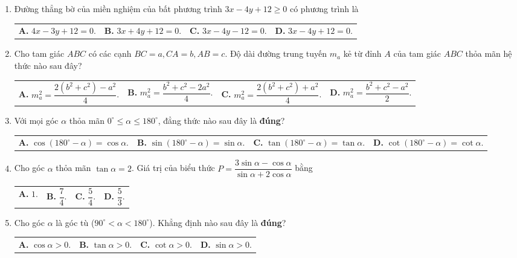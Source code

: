 \documentclass[12pt,a4paper]{article}
\makeatletter
\newcommand{\four}[4]{\par\noindent\begin{tabularx}{\linewidth}{@{}*{4}{>{\raggedright\arraybackslash}X}@{}}\textbf{A.} #1&\textbf{B.} #2&\textbf{C.} #3&\textbf{D.} #4\end{tabularx}}
\makeatother
\begin{document}
\begin{enumerate}
\item Đường thẳng bờ của miền nghiệm của bất phương trình $3x - 4y + 12 \ge 0$ có phương trình là
\four{$4x - 3y + 12 = 0$.}{$3x + 4y + 12 = 0$.}{$3x - 4y - 12 = 0$.}{$3x - 4y + 12 = 0$.}

\item Cho tam giác $ABC$ có các cạnh $BC = a, CA = b, AB = c$. Độ dài đường trung tuyến $m_a$ kẻ từ đỉnh $A$ của tam giác $ABC$ thỏa mãn hệ thức nào sau đây?
\four{$m_a^2 = \dfrac{2(b^2 + c^2) - a^2}{4}$.}{$m_a^2 = \dfrac{b^2 + c^2 - 2a^2}{4}$.}{$m_a^2 = \dfrac{2(b^2 + c^2) + a^2}{4}$.}{$m_a^2 = \dfrac{b^2 + c^2 - a^2}{2}$.}

\item Với mọi góc $\alpha$ thỏa mãn $0^\circ \le \alpha \le 180^\circ$, đẳng thức nào sau đây là \textbf{đúng}?
\four{$\cos(180^\circ - \alpha) = \cos \alpha$.}{$\sin(180^\circ - \alpha) = \sin \alpha$.}{$\tan(180^\circ - \alpha) = \tan \alpha$.}{$\cot(180^\circ - \alpha) = \cot \alpha$.}

\item Cho góc $\alpha$ thỏa mãn $\tan \alpha = 2$. Giá trị của biểu thức $P = \dfrac{3\sin \alpha - \cos \alpha}{\sin \alpha + 2\cos \alpha}$ bằng
\four{$1$.}{$\dfrac{7}{4}$.}{$\dfrac{5}{4}$.}{$\dfrac{5}{3}$.}

\item Cho góc $\alpha$ là góc tù ($90^\circ < \alpha < 180^\circ$). Khẳng định nào sau đây là \textbf{đúng}?
\four{$\cos \alpha > 0$.}{$\tan \alpha > 0$.}{$\cot \alpha > 0$.}{$\sin \alpha > 0$.}
\end{enumerate}
\end{document}

